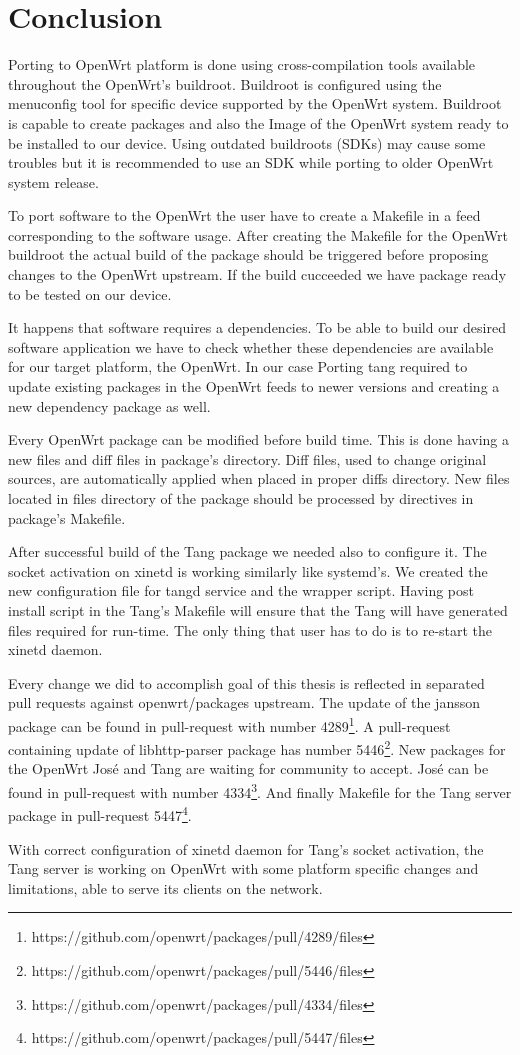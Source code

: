 \chapter{Conclusion}\label{conlusion}


Porting to OpenWrt platform is done using cross-compilation tools available throughout the OpenWrt's buildroot.
Buildroot is configured using the menuconfig tool for specific device supported by the OpenWrt system.
Buildroot is capable to create packages and also the Image of the OpenWrt system ready to be installed to our device.
Using outdated buildroots (SDKs) may cause some troubles but it is recommended to use an SDK while porting to older OpenWrt system release.

To port software to the OpenWrt the user have to create a Makefile in a feed corresponding to the software usage.
After creating the Makefile for the OpenWrt buildroot the actual build of the package should be triggered before proposing changes to the OpenWrt upstream.
If the build cucceeded we have package ready to be tested on our device.

It happens that software requires a dependencies.
To be able to build our desired software application we have to check whether these dependencies are available for our target platform, the OpenWrt.
In our case Porting tang required to update existing packages in the OpenWrt feeds to newer versions and creating a new dependency package as well.

Every OpenWrt package can be modified before build time.
This is done having a new files and diff files in package's directory.
Diff files, used to change original sources, are automatically applied when placed in proper diffs directory.
New files located in files directory of the package should be processed by directives in package's Makefile.

After successful build of the Tang package we needed also to configure it.
The socket activation on xinetd is working similarly like systemd's.
We created the new configuration file for tangd service and the wrapper script.
Having post install script in the Tang's Makefile will ensure that the Tang will have generated files required for run-time.
The only thing that user has to do is to re-start the xinetd daemon.

Every change we did to accomplish goal of this thesis is reflected in separated pull requests against openwrt/packages upstream.
The update of the jansson package can be found in pull-request with number 4289\footnote{https://github.com/openwrt/packages/pull/4289/files}.
A pull-request containing update of libhttp-parser package has number 5446\footnote{https://github.com/openwrt/packages/pull/5446/files}.
New packages for the OpenWrt José and Tang are waiting for community to accept.
José can be found in pull-request with number 4334\footnote{https://github.com/openwrt/packages/pull/4334/files}.
And finally Makefile for the Tang server package in pull-request 5447\footnote{https://github.com/openwrt/packages/pull/5447/files}.

With correct configuration of xinetd daemon for Tang's socket activation, the Tang server is working on OpenWrt with some platform specific changes and limitations, able to serve its clients on the network.
